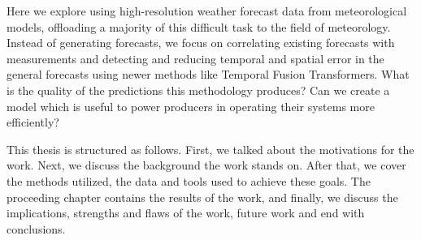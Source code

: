 Here we explore using high-resolution weather forecast data from meteorological models, offloading a majority of this difficult task to the field of meteorology. Instead of generating forecasts, we focus on correlating existing forecasts with measurements and detecting and reducing temporal and spatial error in the general forecasts using newer methods like Temporal Fusion Transformers.
What is the quality of the predictions this methodology produces? Can we create a model which is useful to power producers in operating their systems more efficiently?


This thesis is structured as follows. First, we talked about the motivations for the work. Next, we discuss the background the work stands on. After that, we cover the methods utilized, the data and tools used to achieve these goals. The proceeding chapter contains the results of the work, and finally, we discuss the implications, strengths and flaws of the work, future work and end with conclusions.







